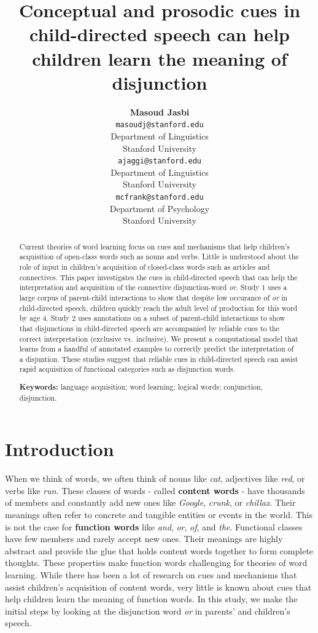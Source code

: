 \documentclass[10pt, letterpaper]{article}
\title{Conceptual and prosodic cues in child-directed speech can help children
learn the meaning of disjunction}
\author{{\large \bf Masoud Jasbi} \\ \texttt{masoudj@stanford.edu} \\ Department of Linguistics \\ Stanford University \And {\large \bf Akshay Jaggi} \\ \texttt{ajaggi@stanford.edu} \\ Department of Linguistics \\ Stanford University \And {\large \bf Michael C. Frank} \\ \texttt{mcfrank@stanford.edu} \\ Department of Psychology \\ Stanford University }
\begin{document}
\maketitle

\begin{abstract}
Current theories of word learning focus on cues and mechanisms that help
children's acquisition of open-class words such as nouns and verbs.
Little is understood about the role of input in children's acquisition
of closed-class words such as articles and connectives. This paper
investigates the cues in child-directed speech that can help the
interpretation and acquisition of the connective disjunction-word
\emph{or}. Study 1 uses a large corpus of parent-child interactions to
show that despite low occurance of \emph{or} in child-directed speech,
children quickly reach the adult level of production for this word by
age 4. Study 2 uses annotations on a subset of parent-child interactions
to show that disjunctions in child-directed speech are accompanied by
reliable cues to the correct interpretation (exclusive vs.~inclusive).
We present a computational model that learns from a handful of annotated
examples to correctly predict the interpretation of a disjuntion. These
studies suggest that reliable cues in child-directed speech can assist
rapid acquisition of functional categories such as disjunction words.

\textbf{Keywords:}
language acquisition; word learning; logical words; conjunction,
disjunction.
\end{abstract}

\section{Introduction}\label{introduction}

When we think of words, we often think of nouns like \emph{cat},
adjectives like \emph{red}, or verbs like \emph{run}. These classes of
words - called \textbf{content words} - have thousands of members and
constantly add new ones like \emph{Google}, \emph{crunk}, or
\emph{chillax}. Their meanings often refer to concrete and tangible
entities or events in the world. This is not the case for
\textbf{function words} like \emph{and}, \emph{or}, \emph{of}, and
\emph{the}. Functional classes have few members and rarely accept new
ones. Their meanings are highly abstract and provide the glue that holds
content words together to form complete thoughts. These properties make
function words challenging for theories of word learning. While there
has been a lot of research on cues and mechanisms that assist children's
acquisition of content words, very little is known about cues that help
children learn the meaning of function words. In this study, we make the
initial steps by looking at the disjunction word \emph{or} in parents'
and children's speech.
\end{document}
